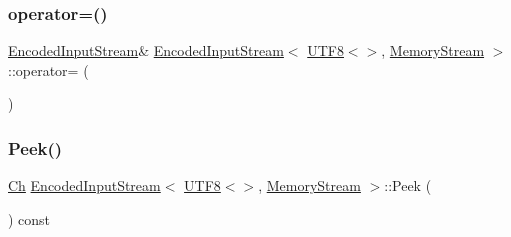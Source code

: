 \subsubsection{\texorpdfstring{operator=()}{operator=()}}
{\footnotesize\ttfamily \hyperlink{classEncodedInputStream}{Encoded\+Input\+Stream}\& \hyperlink{classEncodedInputStream}{Encoded\+Input\+Stream}$<$ \hyperlink{structUTF8}{U\+T\+F8}$<$$>$, \hyperlink{structMemoryStream}{Memory\+Stream} $>$\+::operator= (\begin{DoxyParamCaption}\item[{const \hyperlink{classEncodedInputStream}{Encoded\+Input\+Stream}$<$ \hyperlink{structUTF8}{U\+T\+F8}$<$$>$, \hyperlink{structMemoryStream}{Memory\+Stream} $>$ \&}]{ }\end{DoxyParamCaption})\hspace{0.3cm}{\ttfamily [private]}}

\mbox{\label{classEncodedInputStream_3_01UTF8_3_4_00_01MemoryStream_01_4_aea936f1f1042f3b759cb95bdedf769b6}} 
\subsubsection{\texorpdfstring{Peek()}{Peek()}}
{\footnotesize\ttfamily \hyperlink{classEncodedInputStream_3_01UTF8_3_4_00_01MemoryStream_01_4_a091eb31dd2554bf10054148953f9b3bf}{Ch} \hyperlink{classEncodedInputStream}{Encoded\+Input\+Stream}$<$ \hyperlink{structUTF8}{U\+T\+F8}$<$$>$, \hyperlink{structMemoryStream}{Memory\+Stream} $>$\+::Peek (\begin{DoxyParamCaption}{ }\end{DoxyParamCaption}) const\hspace{0.3cm}{\ttfamily [inline]}}

\mbox{\label{classEncodedInputStream_3_01UTF8_3_4_00_01MemoryStream_01_4_a39fe296cfa45d7f8ef5adc0dd30036c2}} 
